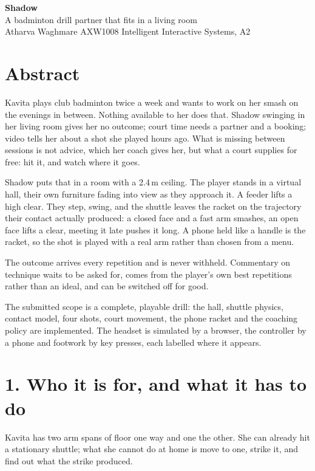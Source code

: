 \documentclass[11pt,a4paper]{article}
\begin{document}
\begin{center}
{\large\bfseries Shadow}\\[0.25em]
{\small A badminton drill partner that fits in a living room}\\[0.6em]
{\small Atharva Waghmare \quad\textbar\quad AXW1008 \quad\textbar\quad Intelligent Interactive Systems, A2}
\end{center}
\renewcommand{\thefootnote}{}

\section*{Abstract}

Kavita plays club badminton twice a week and wants to work on her smash on the
evenings in between. Nothing available to her does that. Shadow swinging in her living
room gives her no outcome; court time needs a partner and a booking; video tells her
about a shot she played hours ago. What is missing between sessions is not advice,
which her coach gives her, but what a court supplies for free: hit it, and watch where
it goes.

Shadow puts that in a room with a 2.4\,m ceiling. The player stands in a virtual hall,
their own furniture fading into view as they approach it. A feeder lifts a high clear.
They step, swing, and the shuttle leaves the racket on the trajectory their contact
actually produced: a closed face and a fast arm smashes, an open face lifts a clear,
meeting it late pushes it long. A phone held like a handle is the racket, so the shot
is played with a real arm rather than chosen from a menu.

The outcome arrives every repetition and is never withheld. Commentary on technique
waits to be asked for, comes from the player's own best repetitions rather than an
ideal, and can be switched off for good.

The submitted scope is a complete, playable drill: the hall, shuttle physics, contact
model, four shots, court movement, the phone racket and the coaching policy are
implemented. The headset is simulated by a browser, the controller by a phone and
footwork by key presses, each labelled where it appears.

\section*{1. Who it is for, and what it has to do}

Kavita has two arm spans of floor one way and one the other. She can already hit a
stationary shuttle; what she cannot do at home is move to one, strike it, and find out
what the strike produced.
\end{document}
